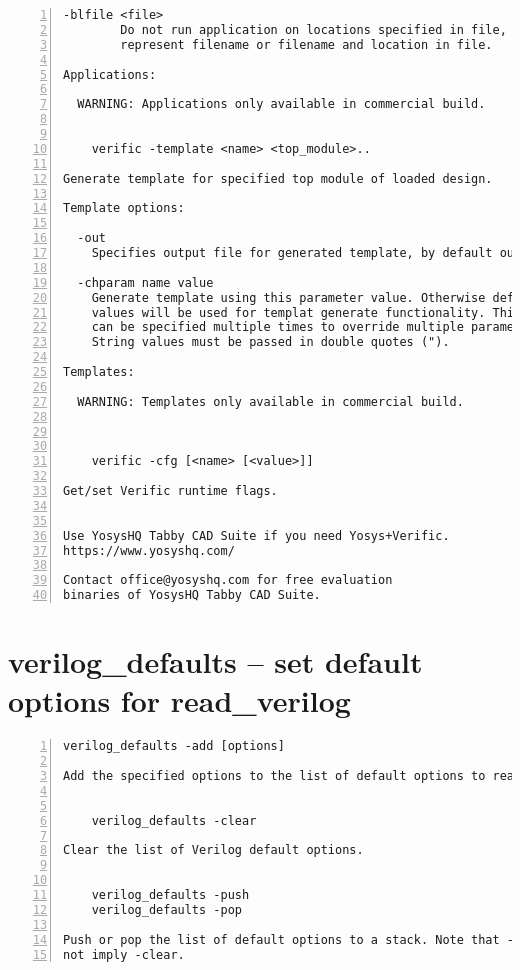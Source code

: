 \begin{lstlisting}[numbers=left,frame=single]
    -blfile <file>
        Do not run application on locations specified in file, they can
        represent filename or filename and location in file.

Applications:

  WARNING: Applications only available in commercial build.


    verific -template <name> <top_module>..

Generate template for specified top module of loaded design.

Template options:

  -out
    Specifies output file for generated template, by default output is stdout

  -chparam name value 
    Generate template using this parameter value. Otherwise default parameter
    values will be used for templat generate functionality. This option
    can be specified multiple times to override multiple parameters.
    String values must be passed in double quotes (").

Templates:

  WARNING: Templates only available in commercial build.



    verific -cfg [<name> [<value>]]

Get/set Verific runtime flags.


Use YosysHQ Tabby CAD Suite if you need Yosys+Verific.
https://www.yosyshq.com/

Contact office@yosyshq.com for free evaluation
binaries of YosysHQ Tabby CAD Suite.
\end{lstlisting}

\section{verilog\_defaults -- set default options for read\_verilog}
\label{cmd:verilog_defaults}
\begin{lstlisting}[numbers=left,frame=single]
    verilog_defaults -add [options]

Add the specified options to the list of default options to read_verilog.


    verilog_defaults -clear

Clear the list of Verilog default options.


    verilog_defaults -push
    verilog_defaults -pop

Push or pop the list of default options to a stack. Note that -push does
not imply -clear.
\end{lstlisting}

